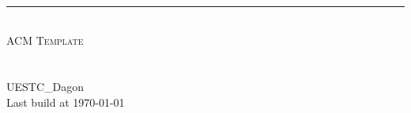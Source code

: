 \documentclass[a4paper]{article}
\begin{document}
\pagestyle{fancy}
\lhead{}
\chead{}
\lfoot{}
\cfoot{}
\rfoot{\bfseries\thepage}
\begin{titlepage}
	\pagestyle{empty}
	
  \begin{center}
		~\\[80pt]
    \hrule\ \\[8pt]
    \fontsize{48pt}{\baselineskip}\selectfont  \textsc{ACM Template}\\[8pt]
    ~\\[20pt]
    ~\\[20pt]
    \huge UESTC\_Dagon\\[8pt]
    \Large Last build at \today
  \end{center}
\end{titlepage}
\restoregeometry
\tableofcontents\clearpage

\end{document}
